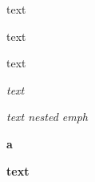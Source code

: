 \documentclass[12pt]{article}
\newcommand\"{quote}
\begin{document}


\textnormal{text}

\textrm{text}

\textsf{text}

\emph{text}

\emph{text \emph{nested} emph}

\textbf{a}

\textbf{text}
\end{document}
